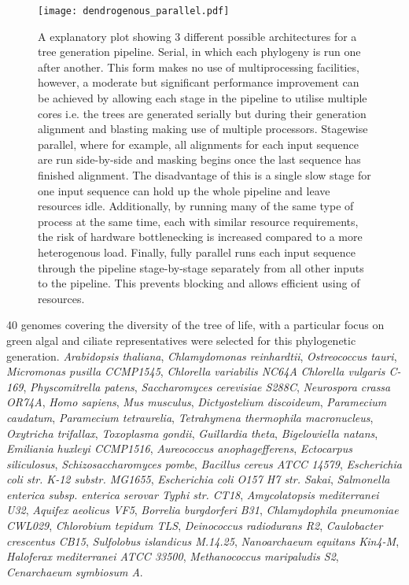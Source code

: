 \begin{figure}
    \texttt{[image: dendrogenous\_parallel.pdf]}
    \caption{A explanatory plot showing 3 different possible architectures for a tree generation pipeline. 
        Serial, in which each phylogeny is run one after another.  This form makes no use of multiprocessing
        facilities, however, a moderate but significant performance improvement can be achieved by allowing
        each stage in the pipeline to utilise multiple cores i.e. the trees are generated serially but during
        their generation alignment and blasting making use of multiple processors.          
        Stagewise parallel, where for example, all alignments for each input sequence are run side-by-side 
        and masking begins once the last sequence has finished alignment.  The disadvantage of this is a single
        slow stage for one input sequence can hold up the whole pipeline and leave resources idle.  Additionally,
        by running many of the same type of process at the same time, each with similar resource requirements,
        the risk of hardware bottlenecking is increased compared to a more heterogenous load.
        Finally, fully parallel runs each input sequence through the pipeline stage-by-stage separately
    from all other inputs to the pipeline. This prevents blocking and allows efficient using of resources.}
    \label{fig:ddg}
\end{figure}

40 genomes covering the diversity of the tree of life, with a particular focus on green algal and ciliate representatives 
were selected for this phylogenetic generation.
\textit{Arabidopsis thaliana}, \textit{Chlamydomonas reinhardtii},
\textit{Ostreococcus tauri}, \textit{Micromonas pusilla CCMP1545},  \textit{Chlorella variabilis NC64A}
\textit{Chlorella vulgaris C-169}, \textit{Physcomitrella patens}, \textit{Saccharomyces cerevisiae S288C}, 
\textit{Neurospora crassa OR74A},
\textit{Homo sapiens},
\textit{Mus musculus},
\textit{Dictyostelium discoideum},
\textit{Paramecium caudatum},
\textit{Paramecium tetraurelia},
\textit{Tetrahymena thermophila macronucleus},
\textit{Oxytricha trifallax},
\textit{Toxoplasma gondii},
\textit{Guillardia theta},
\textit{Bigelowiella natans},
\textit{Emiliania huxleyi CCMP1516},
\textit{Aureococcus anophagefferens},
\textit{Ectocarpus siliculosus},
\textit{Schizosaccharomyces pombe},
\textit{Bacillus cereus ATCC 14579},
\textit{Escherichia coli str. K-12 substr. MG1655},
\textit{Escherichia coli O157 H7 str. Sakai},
\textit{Salmonella enterica subsp. enterica serovar Typhi str. CT18},
\textit{Amycolatopsis mediterranei U32},
\textit{Aquifex aeolicus VF5},
\textit{Borrelia burgdorferi B31},
\textit{Chlamydophila pneumoniae CWL029},
\textit{Chlorobium tepidum TLS},
\textit{Deinococcus radiodurans R2},
\textit{Caulobacter crescentus CB15},
\textit{Sulfolobus islandicus M.14.25},
\textit{Nanoarchaeum equitans Kin4-M},
\textit{Haloferax mediterranei ATCC 33500},
\textit{Methanococcus maripaludis S2},
\textit{Cenarchaeum symbiosum A}.

